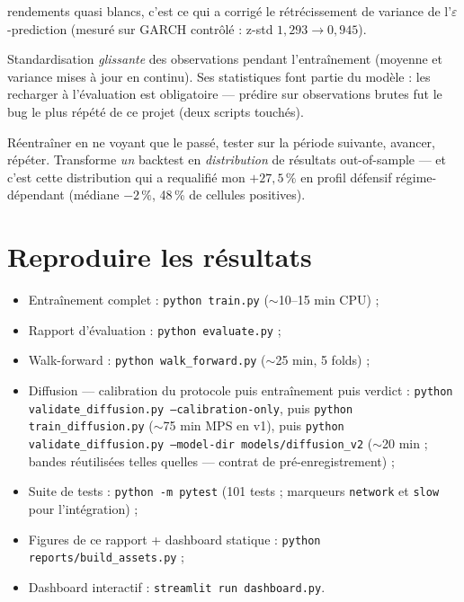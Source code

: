 \documentclass[11pt,a4paper]{article}
\newcommand{\code}[1]{\texttt{#1}}
\begin{document}
\begin{description}[itemsep=4pt, font=\normalfont\bfseries]
        rendements quasi blancs, c'est ce qui a corrigé le rétrécissement de variance
        de l'$\varepsilon$-prediction (mesuré sur GARCH contrôlé : z-std $1{,}293
        \to 0{,}945$).
  \item[VecNormalize] Standardisation \emph{glissante} des observations pendant
        l'entraînement (moyenne et variance mises à jour en continu). Ses
        statistiques font partie du modèle : les recharger à l'évaluation est
        obligatoire --- prédire sur observations brutes fut le bug le plus répété de
        ce projet (deux scripts touchés).
  \item[Walk-forward] Réentraîner en ne voyant que le passé, tester sur la période
        suivante, avancer, répéter. Transforme \emph{un} backtest en
        \emph{distribution} de résultats out-of-sample --- et c'est cette distribution
        qui a requalifié mon $+27{,}5\,\%$ en profil défensif régime-dépendant
        (médiane $-2\,\%$, 48\,\% de cellules positives).
\end{description}

\section{Reproduire les résultats}

\begin{itemize}[itemsep=1pt]
  \item Entraînement complet : \code{python train.py} ($\sim$10--15 min CPU) ;
  \item Rapport d'évaluation : \code{python evaluate.py} ;
  \item Walk-forward : \code{python walk\_forward.py} ($\sim$25 min, 5 folds) ;
  \item Diffusion --- calibration du protocole puis entraînement puis verdict :
        \code{python validate\_diffusion.py --calibration-only}, puis
        \code{python train\_diffusion.py} ($\sim$75 min MPS en v1), puis
        \code{python validate\_diffusion.py --model-dir models/diffusion\_v2}
        ($\sim$20 min ; bandes réutilisées telles quelles --- contrat de
        pré-enregistrement) ;
  \item Suite de tests : \code{python -m pytest} (101 tests ; marqueurs \code{network}
        et \code{slow} pour l'intégration) ;
  \item Figures de ce rapport + dashboard statique : \code{python reports/build\_assets.py} ;
  \item Dashboard interactif : \code{streamlit run dashboard.py}.
\end{itemize}
\end{document}
